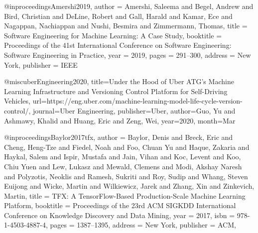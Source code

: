 
@inproceedings{Amershi2019,
 author = {Amershi, Saleema and Begel, Andrew and Bird, Christian and DeLine, Robert and Gall, Harald and Kamar, Ece and Nagappan, Nachiappan and Nushi, Besmira and Zimmermann, Thomas},
 title = {Software Engineering for Machine Learning: A Case Study},
 booktitle = {Proceedings of the 41st International Conference on Software Engineering: Software Engineering in Practice},
 year = {2019},
 pages = {291--300},
 address = {New York},
 publisher = {IEEE}
} 


@misc{uberEngineering2020, 
title={Under the Hood of Uber ATG’s Machine Learning Infrastructure and Versioning Control Platform for Self-Driving Vehicles}, url={https://eng.uber.com/machine-learning-model-life-cycle-version-control/}, 
journal={Uber Engineering}, 
publisher={Uber}, 
author={Guo, Yu and Ashmawy, Khalid and Huang, Eric and Zeng, Wei}, year={2020},
month={Mar}}

@inproceedings{Baylor2017tfx,
 author = {Baylor, Denis and Breck, Eric and Cheng, Heng-Tze and Fiedel, Noah and Foo, Chuan Yu and Haque, Zakaria and Haykal, Salem and Ispir, Mustafa and Jain, Vihan and Koc, Levent and Koo, Chiu Yuen and Lew, Lukasz and Mewald, Clemens and Modi, Akshay Naresh and Polyzotis, Neoklis and Ramesh, Sukriti and Roy, Sudip and Whang, Steven Euijong and Wicke, Martin and Wilkiewicz, Jarek and Zhang, Xin and Zinkevich, Martin},
 title = {TFX: A TensorFlow-Based Production-Scale Machine Learning Platform},
 booktitle = {Proceedings of the 23rd ACM SIGKDD International Conference on Knowledge Discovery and Data Mining},
 year = {2017},
 isbn = {978-1-4503-4887-4},
 pages = {1387--1395},
 address = {New York},
 publisher = {ACM},
} 

